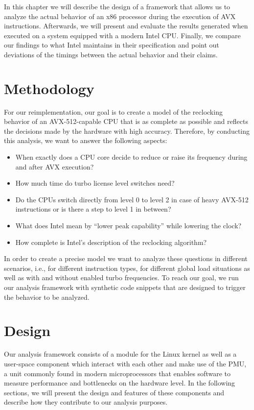 In this chapter we will describe the design of a framework that allows us to analyze the actual behavior of an x86 processor during the execution of \gls{AVX} instructions. Afterwards, we will present and evaluate the results generated when executed on a system equipped with a modern Intel \gls{CPU}. Finally, we compare our findings to what Intel maintains in their specification and point out deviations of the timings between the actual behavior and their claims.

\section{Methodology}
\label{sec:analysis:methodology}

For our reimplementation, our goal is to create a model of the reclocking behavior of an \gls{AVX-512}-capable \gls{CPU} that is as complete as possible and reflects the decisions made by the hardware with high accuracy. Therefore, by conducting this analysis, we want to answer the following aspects:

\begin{itemize}
	\item When exactly does a \gls{CPU} core decide to reduce or raise its frequency during and after \gls{AVX} execution?
	\item How much time do turbo license level switches need?
	\item Do the \glspl{CPU} switch directly from level 0 to level 2 in case of heavy \gls{AVX-512} instructions or is there a step to level 1 in between?
	\item What does Intel mean by \enquote{lower peak capability} while lowering the clock?
	\item How complete is Intel's description of the reclocking algorithm?
\end{itemize}

In order to create a precise model we want to analyze these questions in different scenarios, i.e., for different instruction types, for different global load situations as well as with and without enabled turbo frequencies. To reach our goal, we run our analysis framework with synthetic code snippets that are designed to trigger the behavior to be analyzed.

\section{Design}
\label{sec:analysis:design}

Our analysis framework consists of a module for the Linux kernel as well as a user-space component which interact with each other and make use of the \gls{PMU}, a unit commonly found in modern microprocessors that enables software to measure performance and bottlenecks on the hardware level. In the following sections, we will present the design and features of these components and describe how they contribute to our analysis purposes.

